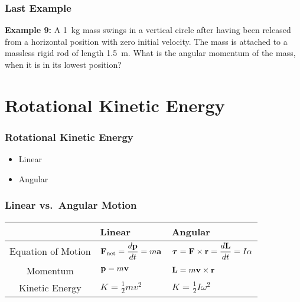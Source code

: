 \documentclass[12pt,compress,aspectratio=169]{beamer}
\newcommand{\mb}[1]{\ensuremath\mathbf{#1}}
\begin{document}
\begin{frame}
  \frametitle{Last Example}
  \textbf{Example 9:} A \SI{1}{\kg} mass swings in a vertical circle after
  having been released from a horizontal position with zero initial velocity.
  The mass is attached to a massless rigid rod of length \SI{1.5}{\metre}. What
  is the angular momentum of the mass, when it is in its lowest position?
\end{frame}


\section{Rotational Kinetic Energy}

\begin{frame}
  \frametitle{Rotational Kinetic Energy}
  \begin{itemize}
  \item Linear

  \item Angular

  \end{itemize}
\end{frame}

\begin{frame}
  \frametitle{Linear vs.\ Angular Motion}
  \begin{center}
    \begin{tabular}{c|l|l}
      & Linear & Angular\\\hline
      Equation of Motion &
      $\displaystyle \mb{F}_\mathrm{net}=\frac{d\mb{p}}{dt}=m\mb{a}$ &
      $\displaystyle \bm{\tau}=\mb{F}\times\mb{r}=\frac{d\mb{L}}{dt}=I\alpha$\\
      Momentum & $\mb{p}=m\mb{v}$ & $\mb{L}=m\mb{v}\times\mb{r}$\\
      Kinetic Energy & $\displaystyle K=\frac{1}{2}mv^2$ &
      $\displaystyle K=\frac{1}{2}I\omega^2$ \\
      \end{tabular}
  \end{center}
\end{frame}
\end{document}

